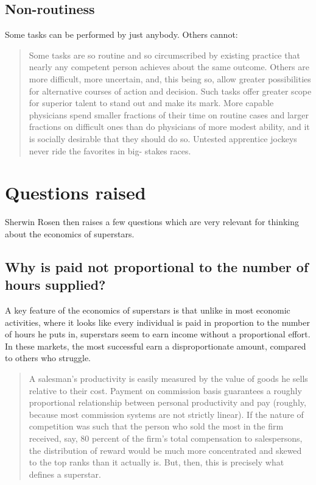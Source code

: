 \documentclass[]{book}
\theoremstyle{definition}
\theoremstyle{definition}
\theoremstyle{definition}
\theoremstyle{remark}
\begin{document}
\subsection{Non-routiness}\label{non-routiness}

Some tasks can be performed by just anybody. Others cannot:

\begin{quote}
Some tasks are so routine and so circumscribed by existing practice that
nearly any competent person achieves about the same outcome. Others are
more difficult, more uncertain, and, this being so, allow greater
possibilities for alternative courses of action and decision. Such tasks
offer greater scope for superior talent to stand out and make its mark.
More capable physicians spend smaller fractions of their time on routine
cases and larger fractions on difficult ones than do physicians of more
modest ability, and it is socially desirable that they should do so.
Untested apprentice jockeys never ride the favorites in big- stakes
races.
\end{quote}

\section{Questions raised}\label{questions-raised}

Sherwin Rosen then raises a few questions which are very relevant for
thinking about the economics of superstars.

\subsection{Why is paid not proportional to the number of hours
supplied?}\label{why-is-paid-not-proportional-to-the-number-of-hours-supplied}

A key feature of the economics of superstars is that unlike in most
economic activities, where it looks like every individual is paid in
proportion to the number of hours he puts in, superstars seem to earn
income without a proportional effort. In these markets, the most
successful earn a disproportionate amount, compared to others who
struggle.

\begin{quote}
A salesman's productivity is easily measured by the value of goods he
sells relative to their cost. Payment on commission basis guarantees a
roughly proportional relationship between personal productivity and pay
(roughly, because most commission systems are not strictly linear). If
the nature of competition was such that the person who sold the most in
the firm received, say, 80 percent of the firm's total compensation to
salespersons, the distribution of reward would be much more concentrated
and skewed to the top ranks than it actually is. But, then, this is
precisely what defines a superstar.
\end{quote}
\end{document}
